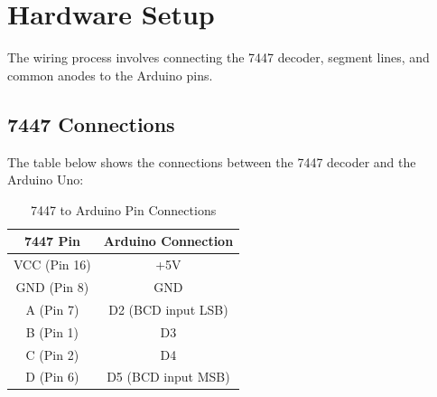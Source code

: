 \documentclass[journal]{IEEEtran}
\begin{document}
\section{Hardware Setup}
The wiring process involves connecting the 7447 decoder, segment lines, and common anodes to the Arduino pins.
\begin{figure}[H]
    \centering
    \hfill
    \label{fig:main_figure}
\end{figure}



\subsection{7447 Connections}
The table below shows the connections between the 7447 decoder and the Arduino Uno:

\begin{table}[H]
    \centering
    \caption{7447 to Arduino Pin Connections}
    \begin{tabular}{|c|c|}
        \hline
        \textbf{7447 Pin} & \textbf{Arduino Connection} \\
        \hline
        VCC (Pin 16) & +5V \\
        GND (Pin 8) & GND \\
        A (Pin 7) & D2 (BCD input LSB) \\
        B (Pin 1) & D3 \\
        C (Pin 2) & D4 \\
        D (Pin 6) & D5 (BCD input MSB) \\
        \hline
    \end{tabular}
\end{table}
\end{document}
